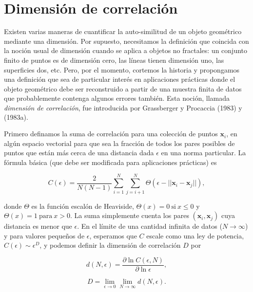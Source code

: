 \documentclass[10pt,a4paper]{book}
\begin{document}
\newpage

\section{Dimensión de correlación}

Existen varias maneras de cuantificar la auto-similitud de un objeto geométrico mediante una dimensión. Por supuesto, necesitamos la definición que coincida con la noción usual de dimensión cuando se aplica a objetos no fractales: un conjunto finito de puntos es de dimensión cero, las líneas tienen dimensión uno, las superficies dos, etc. Pero, por el momento, cortemos la historia y propongamos una definición que sea de particular interés en aplicaciones prácticas donde el objeto geométrico debe ser reconstruido a partir de una muestra finita de datos que probablemente contenga algunos errores también. Esta noción, llamada \textit{dimensión de correlación}, fue introducida por Grassberger y Procaccia (1983) y (1983a).

Primero definamos la suma de correlación para una colección de puntos \(\mathbf{x}_i\), en algún espacio vectorial para que sea la fracción de todos los pares posibles de puntos que están más cerca de una distancia dada \(\epsilon\) en una norma particular. La fórmula básica (que debe ser modificada para aplicaciones prácticas) es

\begin{equation}
C(\epsilon) = \frac{2}{N(N-1)} \sum_{i=1}^N \sum_{j=i+1}^N \Theta(\epsilon - || \mathbf{x}_i - \mathbf{x}_j ||),
\end{equation}

donde \(\Theta\) es la función escalón de Heaviside, \(\Theta(x) = 0 \ \text{si} \ x \leq 0\) y \(\Theta(x) = 1 \ \text{para} \ x > 0\). La suma simplemente cuenta los pares \((\mathbf{x}_i, \mathbf{x}_j)\) cuya distancia es menor que \(\epsilon\). En el límite de una cantidad infinita de datos (\(N \rightarrow \infty\)) y para valores pequeños de \(\epsilon\), esperamos que \(C\) escale como una ley de potencia, \(C(\epsilon) \sim \epsilon^D\), y podemos definir la dimensión de correlación \(D\) por

\begin{equation}
d(N, \epsilon) = \frac{\partial \ln C(\epsilon, N)}{\partial \ln \epsilon}, 
\end{equation}

\begin{equation}
D = \lim_{\epsilon \to 0} \lim_{N \to \infty} d(N, \epsilon).
\end{equation}
\end{document}
